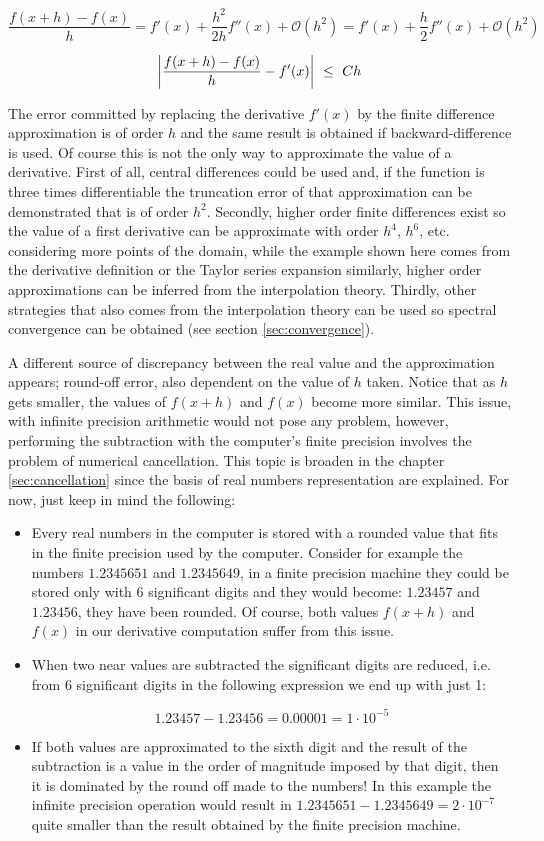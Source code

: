 $$
\frac{f(x+h) - f(x)}{h} = f'(x) + \frac{h^2}{2h} f''(x) + \mathcal{O}(h^2) = f'(x) + \frac{h}{2} f''(x) + \mathcal{O}(h^2) 
$$

$$
\abs{\frac{f(x+h) - f(x)}{h} - f'(x)}  \  \leq  \    C h  
$$

The error committed by replacing the derivative $f'(x)$ by the finite difference approximation is of order $h$ and the same result is obtained if backward-difference is used. Of course this is not the only way to approximate the value of a derivative. First of all, central differences could be used and, if the function is three times differentiable the truncation error of that approximation can be demonstrated that is of order $h^2$. Secondly, higher order finite differences exist so the value of a first derivative can be approximate with order $h^4$, $h^6$, etc. considering more points of the domain, while the example shown here comes from the derivative definition or the Taylor series expansion similarly, higher order approximations can be inferred from the interpolation theory. Thirdly, other strategies that also comes from the interpolation theory can be used so spectral convergence can be obtained (see section \ref{sec:convergence}). 

A different source of discrepancy between the real value and the approximation appears; round-off error, also dependent on the value of $h$ taken. Notice that as $h$ gets smaller, the values of $f(x+h)$ and $f(x)$ become more similar. This issue, with infinite precision arithmetic would not pose any problem, however, performing the subtraction with the computer's finite precision involves the problem of numerical cancellation. This topic is broaden in the chapter \ref{sec:cancellation} since the basis of real numbers representation are explained. For now, just keep in mind the following:

\begin{itemize}
    \item Every real numbers in the computer is stored with a rounded value that fits in the finite precision used by the computer. Consider for example the numbers $1.2345651$ and $1.2345649$, in a finite precision machine they could be stored only with 6 significant digits and they would become: $1.23457$ and $1.23456$, they have been rounded. Of course, both values $f(x+h)$ and $f(x)$ in our derivative computation suffer from this issue.
    
    \item When two near values are subtracted the significant digits are reduced, i.e. from 6 significant digits in the following expression we end up with just 1: 
    
    $$
    1.23457 - 1.23456 = 0.00001 = 1\cdot 10^{-5}
    $$
    
    \item If both values are approximated to the sixth digit and the result of the subtraction is a value in the order of magnitude imposed by that digit, then it is dominated by the round off made to the numbers!
     In this example the infinite precision operation would result in $1.2345651 - 1.2345649 = 2\cdot 10^{-7}$ quite smaller than the result obtained by the finite precision machine. 
\end{itemize}

